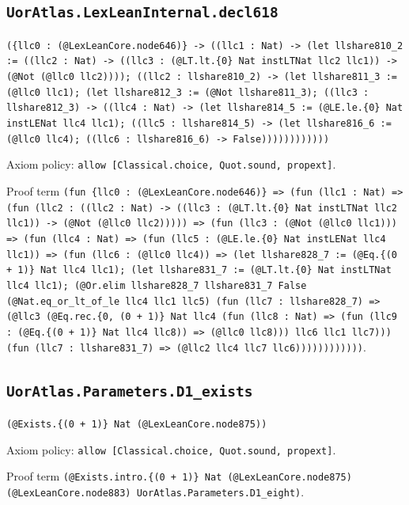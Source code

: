 \documentclass[11pt]{article}
\begin{document}
\subsection*{\texttt{UorAtlas.LexLeanInternal.decl618}}
\noindent\texttt{(\{llc0 : (@LexLeanCore.node646)\} -> ((llc1 : Nat) -> (let llshare810\_2 := ((llc2 : Nat) -> ((llc3 : (@LT.lt.\{0\} Nat instLTNat llc2 llc1)) -> (@Not (@llc0 llc2)))); ((llc2 : llshare810\_2) -> (let llshare811\_3 := (@llc0 llc1); (let llshare812\_3 := (@Not llshare811\_3); ((llc3 : llshare812\_3) -> ((llc4 : Nat) -> (let llshare814\_5 := (@LE.le.\{0\} Nat instLENat llc4 llc1); ((llc5 : llshare814\_5) -> (let llshare816\_6 := (@llc0 llc4); ((llc6 : llshare816\_6) -> False))))))))))))}\par
\noindent Axiom policy: \texttt{allow [Classical.choice, Quot.sound, propext]}.\par
\noindent Proof term \texttt{(fun \{llc0 : (@LexLeanCore.node646)\} => (fun (llc1 : Nat) => (fun (llc2 : ((llc2 : Nat) -> ((llc3 : (@LT.lt.\{0\} Nat instLTNat llc2 llc1)) -> (@Not (@llc0 llc2))))) => (fun (llc3 : (@Not (@llc0 llc1))) => (fun (llc4 : Nat) => (fun (llc5 : (@LE.le.\{0\} Nat instLENat llc4 llc1)) => (fun (llc6 : (@llc0 llc4)) => (let llshare828\_7 := (@Eq.\{(0 + 1)\} Nat llc4 llc1); (let llshare831\_7 := (@LT.lt.\{0\} Nat instLTNat llc4 llc1); (@Or.elim llshare828\_7 llshare831\_7 False (@Nat.eq\_or\_lt\_of\_le llc4 llc1 llc5) (fun (llc7 : llshare828\_7) => (@llc3 (@Eq.rec.\{0, (0 + 1)\} Nat llc4 (fun (llc8 : Nat) => (fun (llc9 : (@Eq.\{(0 + 1)\} Nat llc4 llc8)) => (@llc0 llc8))) llc6 llc1 llc7))) (fun (llc7 : llshare831\_7) => (@llc2 llc4 llc7 llc6))))))))))))}.\par
\subsection*{\texttt{UorAtlas.Parameters.D1\_exists}}
\noindent\texttt{(@Exists.\{(0 + 1)\} Nat (@LexLeanCore.node875))}\par
\noindent Axiom policy: \texttt{allow [Classical.choice, Quot.sound, propext]}.\par
\noindent Proof term \texttt{(@Exists.intro.\{(0 + 1)\} Nat (@LexLeanCore.node875) (@LexLeanCore.node883) UorAtlas.Parameters.D1\_eight)}.\par
\end{document}
